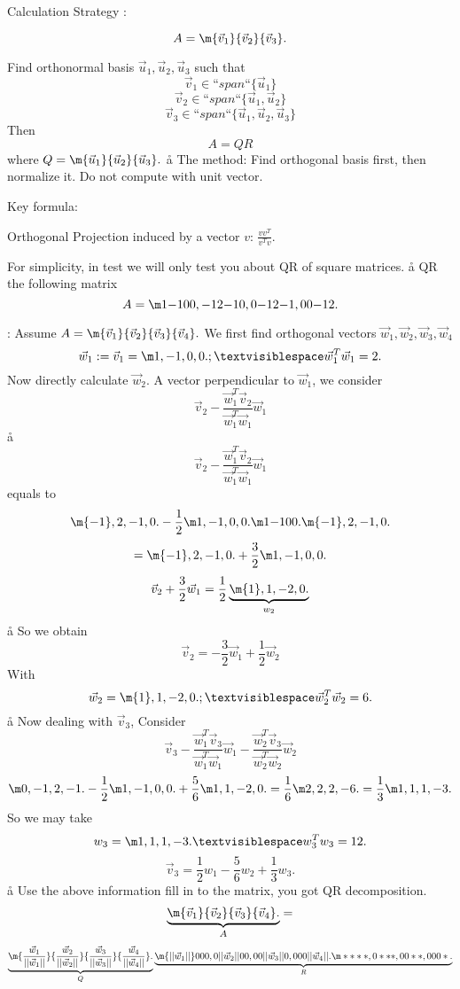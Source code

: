 

Calculation Strategy :

$$
A= \m{\vec v_1}{\vec v_2}{\vec v_3}.
$$

Find orthonormal basis $\vec u_1,\vec u_2,\vec u_3$ such that 
$$ \vec v_1  ∈ “span“\{\vec u_1\} $$
$$ \vec v_2  ∈ “span“\{\vec u_1,\vec u_2\} $$
$$ \vec v_3  ∈ “span“\{\vec u_1,\vec u_2,\vec u_3\} $$
Then 
$$
A=QR
$$
where $Q=\m{\vec u_1}{\vec u_2}{\vec u_3}.$ 
\a\aa
The method: Find orthogonal basis first, then normalize it. Do not compute with unit vector.

Key formula:

Orthogonal Projection induced by a vector $v$: $\frac{vv^T}{v^Tv}$.

For simplicity, in test we will only test you about QR of square matrices.
\a\aa
\exe QR the following matrix
$$
A = \m1{-1}00,{-1}2{-1}0,0{-1}2{-1},00{-1}2.
$$

\sol: Assume $A=\m{\vec v_1}{\vec v_2}{\vec v_3}{\vec v_4}.$ We first find orthogonal vectors $\vec w_1,\vec w_2,\vec w_3,\vec w_4$
$$
\vec w_1:=\vec v_1 = \m1,{-1},0,0.; ␣ \vec w_1^T\vec w_1 = 2.
$$
Now directly calculate $\vec w_2$. A vector perpendicular to $\vec w_1$, we consider
$$
\vec v_2 - \frac{\vec w_1^T\vec v_2}{\vec w_1^T\vec w_1}\vec w_1
$$
\a\aa
$$
\vec v_2 - \frac{\vec w_1^T\vec v_2}{\vec w_1^T\vec w_1}\vec w_1
$$
equals to
$$
\m{-1},2,{-1},0. - \frac12 \m1,{-1},0,0.\m1{-1}00.\m{-1},2,{-1},0.
$$
$$
=\m{-1},2,{-1},0. + \frac32 \m1,{-1},0,0.
$$
$$
\vec v_2 + \frac32\vec w_1=\frac12\underbrace{\m{1},1,{-2},0.}_{w_2}
$$
\a\aa
So we obtain 
$$
\vec v_2 = -\frac32\vec w_1+\frac12\vec w_2
$$
With
$$
\vec w_2= \m{1},1,{-2},0.; ␣ \vec w_2^T\vec w_2 = 6.
$$
\a\aa
Now dealing with $\vec v_3$, Consider
$$
\vec v_3 
- \frac{\vec w_1^T\vec v_3}{\vec w_1^T\vec w_1}\vec w_1
- \frac{\vec w_2^T\vec v_3}{\vec w_2^T\vec w_2}\vec w_2
$$
$$
\m0,{-1},2,{-1}. 
- \frac12\m1,{-1},0,0.
+\frac56\m1,1,{-2},0.
=\frac16\m2,2,2,{-6}.
=\frac13\m1,1,1,{-3}.
$$
So we may take
$$
w_3 = \m1,1,1,{-3}. ␣   w_3^Tw_3 = 12. 
$$
$$
\vec v_3 = \frac12 w_1-\frac56 w_2+\frac13 w_3.
$$
\a\aa
Use the above information fill in to the matrix, you got QR decomposition.
$$
\underbrace{\m{\vec v_1}{\vec v_2}{\vec v_3}{\vec v_4}.}_A=
$$
$$
\underbrace{\m
{\frac{\vec w_1}{||\vec w_1||}}
{\frac{\vec w_2}{||\vec w_2||}}
{\frac{\vec w_3}{||\vec w_3||}}
{\frac{\vec w_4}{||\vec w_4||}}.
}_Q
\underbrace{
\m
{||\vec w_1||}000,
0{||\vec w_2||}00,
00{||\vec w_3||}0,
000{||\vec w_4||}.
\m****,0***,00**,000*.}_R
$$
\aaa

